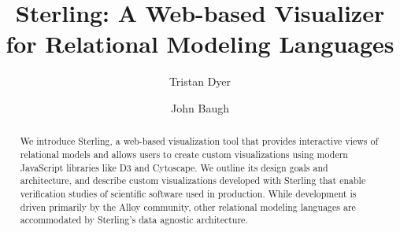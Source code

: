 \documentclass[runningheads]{llncs}
\begin{document}
\title{Sterling: A Web-based Visualizer\\ for Relational Modeling Languages}
\author{Tristan Dyer  \and John Baugh }



\maketitle

\begin{abstract}
We introduce Sterling, a web-based visualization tool that provides interactive views of relational models and allows users to create custom visualizations using modern JavaScript libraries like D3 and Cytoscape.
We outline its design goals and architecture, and describe custom visualizations developed with Sterling that enable verification studies of scientific software used in production.
While development is driven primarily by the Alloy community, other relational modeling languages are accommodated by Sterling's data agnostic architecture.
\end{abstract}

\end{document}
